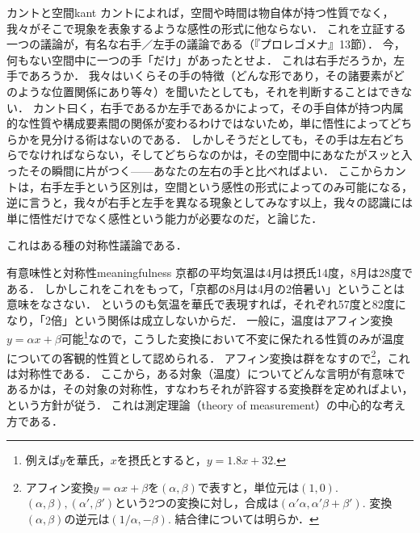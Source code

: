 \documentclass[11pt,a4paper]{jsarticle}
\begin{document}
\begin{rei}{カントと空間}{kant}
カントによれば，空間や時間は物自体が持つ性質でなく，我々がそこで現象を表象するような感性の形式に他ならない．
これを立証する一つの議論が，有名な右手／左手の議論である（『プロレゴメナ』13節）．
今，何もない空間中に一つの手「だけ」があったとせよ．
これは右手だろうか，左手であろうか．
我々はいくらその手の特徴（どんな形であり，その諸要素がどのような位置関係にあり等々）を聞いたとしても，それを判断することはできない．
カント曰く，右手であるか左手であるかによって，その手自体が持つ内属的な性質や構成要素間の関係が変わるわけではないため，単に悟性によってどちらかを見分ける術はないのである．
しかしそうだとしても，その手は左右どちらでなければならない，そしてどちらなのかは，その空間中にあなたがスッと入ったその瞬間に片がつく------あなたの左右の手と比べればよい．
ここからカントは，右手左手という区別は，空間という感性の形式によってのみ可能になる，逆に言うと，我々が右手と左手を異なる現象としてみなす以上，我々の認識には単に悟性だけでなく感性という能力が必要なのだ，と論じた．
 
これはある種の対称性議論である．

\end{rei}

\begin{rei}{有意味性と対称性}{meaningfulness}
京都の平均気温は4月は摂氏14度，8月は28度である．
しかしこれをこれをもって，「京都の8月は4月の2倍暑い」ということは意味をなさない．
というのも気温を華氏で表現すれば，それぞれ57度と82度になり，「2倍」という関係は成立しないからだ．
一般に，温度はアフィン変換$y = \alpha x + \beta$可能\footnote{例えば$y$を華氏，$x$を摂氏とすると，$y = 1.8x+32$.}なので，こうした変換において不変に保たれる性質のみが温度についての客観的性質として認められる．
アフィン変換は群をなすので\footnote{アフィン変換$y=\alpha x + \beta$を$(\alpha, \beta)$で表すと，単位元は$(1,0)$. $(\alpha, \beta), (\alpha',\beta')$という2つの変換に対し，合成は$(\alpha' \alpha, \alpha' \beta + \beta')$. 変換$(\alpha, \beta)$の逆元は$(1/\alpha, -\beta)$. 結合律については明らか．}，これは対称性である．
ここから，ある対象（温度）についてどんな言明が有意味であるかは，その対象の対称性，すなわちそれが許容する変換群を定めればよい，という方針が従う．
これは測定理論（theory of measurement）の中心的な考え方である\citep[e.g,][]{Narens2007-ty}．
\end{rei}
\end{document}
